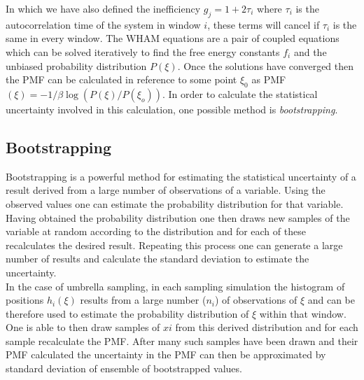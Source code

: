\documentclass[12pt, onecolumn]{revtex4}    %
\begin{document}
In which we have also defined the inefficiency $g_j = 1 + 2 \tau_i$ where $\tau_i$ is the autocorrelation time \cite{GWHAM} of the system in window $i$, these terms will cancel if $\tau_i$ is the same in every window.  The WHAM equations are a pair of coupled equations which can be solved iteratively \cite{GWHAM}to find the free energy constants $f_i$ and the unbiased probability distribution $P(\xi)$.  Once the solutions have converged then the PMF can be calculated in reference to some point $\xi_0$ as PMF$(\xi) = - 1/\beta \log(P(\xi)/P(\xi_o))$\cite{GWHAM}.  In order to calculate the statistical uncertainty involved in this calculation, one possible method is \textit{bootstrapping}\cite{GWHAM}.

\subsection{Bootstrapping}

Bootstrapping is a powerful method for estimating the statistical uncertainty of a result derived from a large number of observations of a variable\cite{GWHAM}.  Using the observed values one can estimate the probability distribution for that variable.  Having obtained the probability distribution one then draws new samples of the variable at random according to the distribution and for each of these recalculates the desired result.  Repeating this process one can generate a large number of results and calculate the standard deviation to estimate the uncertainty.\cite{GWHAM}\\

In the case of umbrella sampling, in each sampling simulation the histogram of positions $h_i(\xi)$ results from a large number ($n_i$) of observations of $\xi$ and can be therefore used to estimate the probability distribution of $\xi$ within that window.  One is able to then draw samples of $xi$ from this derived distribution and for each sample recalculate the PMF\cite{GWHAM}.  After many such samples have been drawn and their PMF calculated the uncertainty in the PMF can then be approximated by standard deviation of ensemble of bootstrapped values.\\
\end{document}
